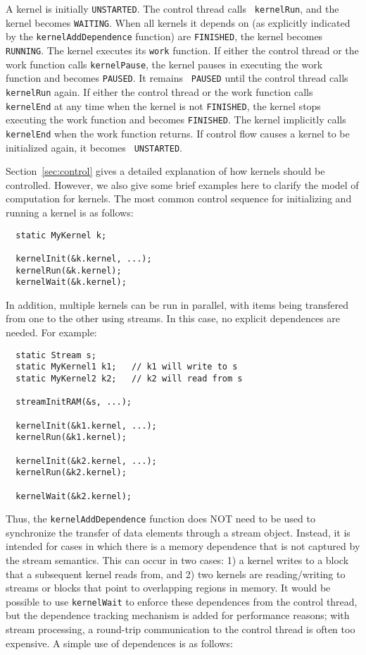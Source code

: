A kernel is initially {\tt UNSTARTED}.  The control thread calls {\tt
kernelRun}, and the kernel becomes {\tt WAITING}.  When all kernels it
depends on (as explicitly indicated by the {\tt kernelAddDependence}
function) are {\tt FINISHED}, the kernel becomes {\tt RUNNING}. The
kernel executes its {\tt work} function.  If either the control thread
or the work function calls {\tt kernelPause}, the kernel pauses in
executing the work function and becomes {\tt PAUSED}. It remains {\tt
PAUSED} until the control thread calls {\tt kernelRun} again. If
either the control thread or the work function calls {\tt kernelEnd}
at any time when the kernel is not {\tt FINISHED}, the kernel stops
executing the work function and becomes {\tt FINISHED}. The kernel
implicitly calls {\tt kernelEnd} when the work function returns. If
control flow causes a kernel to be initialized again, it becomes {\tt
UNSTARTED}.

Section~\ref{sec:control} gives a detailed explanation of how kernels
should be controlled.  However, we also give some brief examples here
to clarify the model of computation for kernels.  The most common
control sequence for initializing and running a kernel is as follows:

{\small
\begin{verbatim}
  static MyKernel k;

  kernelInit(&k.kernel, ...);
  kernelRun(&k.kernel);
  kernelWait(&k.kernel);
\end{verbatim}}

In addition, multiple kernels can be run in parallel, with items being
transfered from one to the other using streams.  In this case, no
explicit dependences are needed.  For example:

{\small
\begin{verbatim}
  static Stream s;
  static MyKernel1 k1;   // k1 will write to s
  static MyKernel2 k2;   // k2 will read from s

  streamInitRAM(&s, ...);

  kernelInit(&k1.kernel, ...);  
  kernelRun(&k1.kernel);

  kernelInit(&k2.kernel, ...);
  kernelRun(&k2.kernel);

  kernelWait(&k2.kernel);
\end{verbatim}}

Thus, the {\tt kernelAddDependence} function does NOT need to be used
to synchronize the transfer of data elements through a stream object.
Instead, it is intended for cases in which there is a memory
dependence that is not captured by the stream semantics.  This can
occur in two cases: 1) a kernel writes to a block that a subsequent
kernel reads from, and 2) two kernels are reading/writing to streams
or blocks that point to overlapping regions in memory.  It would be
possible to use {\tt kernelWait} to enforce these dependences from the
control thread, but the dependence tracking mechanism is added for
performance reasons; with stream processing, a round-trip
communication to the control thread is often too expensive.  A simple
use of dependences is as follows:

